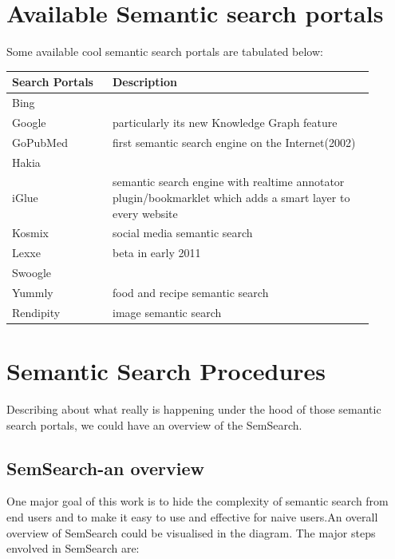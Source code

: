 \documentclass[12pt,a4]{article}
\begin{document}
\section{Available Semantic search portals}
Some available cool semantic search portals are tabulated below:

\begin{tabular}{p{0.25\linewidth}|p{0.65\linewidth}}
  \hline
  Search Portals &Description \\
    \hline
    Bing\\
    Google& particularly its new Knowledge Graph feature\\
    GoPubMed&first semantic search engine on the Internet(2002)\\
    Hakia\\
    iGlue & semantic search engine with realtime annotator plugin/bookmarklet which adds a smart layer to every website\\
    Kosmix & social media semantic search\\
    Lexxe & beta in early 2011\\
    Swoogle\\
    Yummly& food and recipe semantic search\\
    Rendipity & image semantic search\\
    
    \hline
  \end{tabular}
  
  
\section{Semantic Search Procedures}
Describing about what really is happening under the hood of those semantic search portals, we could have an overview of the SemSearch\cite{semsrch}.

\subsection{SemSearch-an overview\cite{semsrch}}
One major goal of this work is to hide the complexity of semantic search from end users and to make it easy to use and effective for naive users.An overall overview of SemSearch could be visualised in the diagram. The major steps envolved in SemSearch are:
\end{document}
